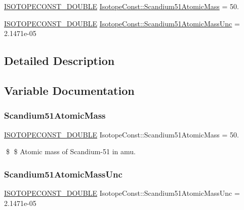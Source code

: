 \begin{DoxyCompactItemize}
\item 
\mbox{\hyperlink{group___isotope_const-_macros_ga8f45a7272ce02c0b4c65c44636ed719a}{I\+S\+O\+T\+O\+P\+E\+C\+O\+N\+S\+T\+\_\+\+D\+O\+U\+B\+LE}} \mbox{\hyperlink{group___isotope_const-_scandium-_sc51_gaa6b03ff19ff5f92a85008ac4eefaa580}{Isotope\+Const\+::\+Scandium51\+Atomic\+Mass}} = 50.
\item 
\mbox{\hyperlink{group___isotope_const-_macros_ga8f45a7272ce02c0b4c65c44636ed719a}{I\+S\+O\+T\+O\+P\+E\+C\+O\+N\+S\+T\+\_\+\+D\+O\+U\+B\+LE}} \mbox{\hyperlink{group___isotope_const-_scandium-_sc51_ga7982c15c15820f92630ca23a4a54bf16}{Isotope\+Const\+::\+Scandium51\+Atomic\+Mass\+Unc}} = 2.\+1471e-\/05
\end{DoxyCompactItemize}


\subsection{Detailed Description}


\subsection{Variable Documentation}
\mbox{\label{group___isotope_const-_scandium-_sc51_gaa6b03ff19ff5f92a85008ac4eefaa580}} 
\subsubsection{\texorpdfstring{Scandium51\+Atomic\+Mass}{Scandium51AtomicMass}}
{\footnotesize\ttfamily \mbox{\hyperlink{group___isotope_const-_macros_ga8f45a7272ce02c0b4c65c44636ed719a}{I\+S\+O\+T\+O\+P\+E\+C\+O\+N\+S\+T\+\_\+\+D\+O\+U\+B\+LE}} Isotope\+Const\+::\+Scandium51\+Atomic\+Mass = 50.}

\$ \$ Atomic mass of Scandium-\/51 in amu. \mbox{\label{group___isotope_const-_scandium-_sc51_ga7982c15c15820f92630ca23a4a54bf16}} 
\subsubsection{\texorpdfstring{Scandium51\+Atomic\+Mass\+Unc}{Scandium51AtomicMassUnc}}
{\footnotesize\ttfamily \mbox{\hyperlink{group___isotope_const-_macros_ga8f45a7272ce02c0b4c65c44636ed719a}{I\+S\+O\+T\+O\+P\+E\+C\+O\+N\+S\+T\+\_\+\+D\+O\+U\+B\+LE}} Isotope\+Const\+::\+Scandium51\+Atomic\+Mass\+Unc = 2.\+1471e-\/05}

